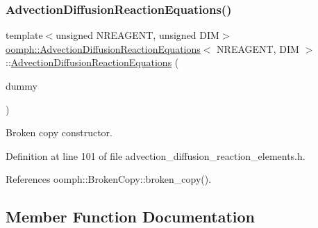 \subsubsection{\texorpdfstring{Advection\+Diffusion\+Reaction\+Equations()}{AdvectionDiffusionReactionEquations()}\hspace{0.1cm}{\footnotesize\ttfamily [2/2]}}
{\footnotesize\ttfamily template$<$unsigned N\+R\+E\+A\+G\+E\+NT, unsigned D\+IM$>$ \\
\hyperlink{classoomph_1_1AdvectionDiffusionReactionEquations}{oomph\+::\+Advection\+Diffusion\+Reaction\+Equations}$<$ N\+R\+E\+A\+G\+E\+NT, D\+IM $>$\+::\hyperlink{classoomph_1_1AdvectionDiffusionReactionEquations}{Advection\+Diffusion\+Reaction\+Equations} (\begin{DoxyParamCaption}\item[{const \hyperlink{classoomph_1_1AdvectionDiffusionReactionEquations}{Advection\+Diffusion\+Reaction\+Equations}$<$ N\+R\+E\+A\+G\+E\+NT, D\+IM $>$ \&}]{dummy }\end{DoxyParamCaption})\hspace{0.3cm}{\ttfamily [inline]}}



Broken copy constructor. 



Definition at line 101 of file advection\+\_\+diffusion\+\_\+reaction\+\_\+elements.\+h.



References oomph\+::\+Broken\+Copy\+::broken\+\_\+copy().



\subsection{Member Function Documentation}
\mbox{\label{classoomph_1_1AdvectionDiffusionReactionEquations_ad7564620f4b3313b09d2a3e675958e10}} 
